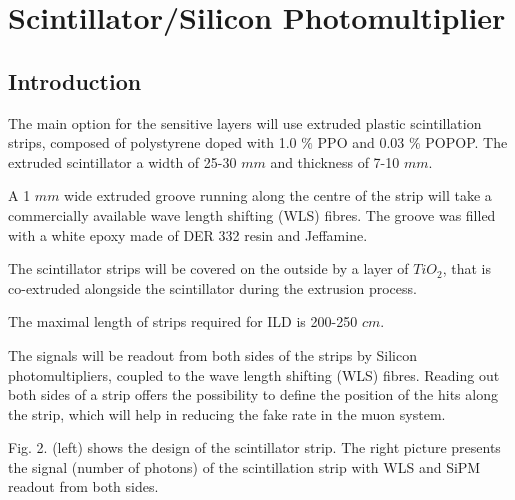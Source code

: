 \documentclass[12pt,twoside,a4paper]{book}
\begin{document}
\section{Scintillator/Silicon Photomultiplier}
\subsection{Introduction}
The main option for the sensitive layers will use extruded plastic scintillation strips, composed of polystyrene doped with 1.0 $\%$ PPO and 0.03 $\%$ POPOP.
The extruded scintillator a width of 25-30 $mm$ and thickness of 7-10 $mm$.

A 1 $mm$ wide extruded groove running along the centre of the strip will take a commercially available wave length shifting (WLS) fibres.
The groove was filled with a white epoxy made of DER 332 resin and Jeffamine.

The scintillator strips will be covered on the outside by a layer of $TiO_2$, that is co-extruded alongside the scintillator during the extrusion process.

The maximal length of strips required for ILD is 200-250 $cm$.

The signals will be readout from both sides of the strips by Silicon photomultipliers, coupled to the wave length shifting (WLS) fibres.
Reading out both sides of a strip offers the possibility to define the position of the hits along the strip, which will help in reducing the fake rate in the muon system.

Fig. 2. (left) shows the design of the scintillator strip. The right picture presents the signal (number of photons) of the scintillation strip with WLS and SiPM readout from both sides.
\end{document}
